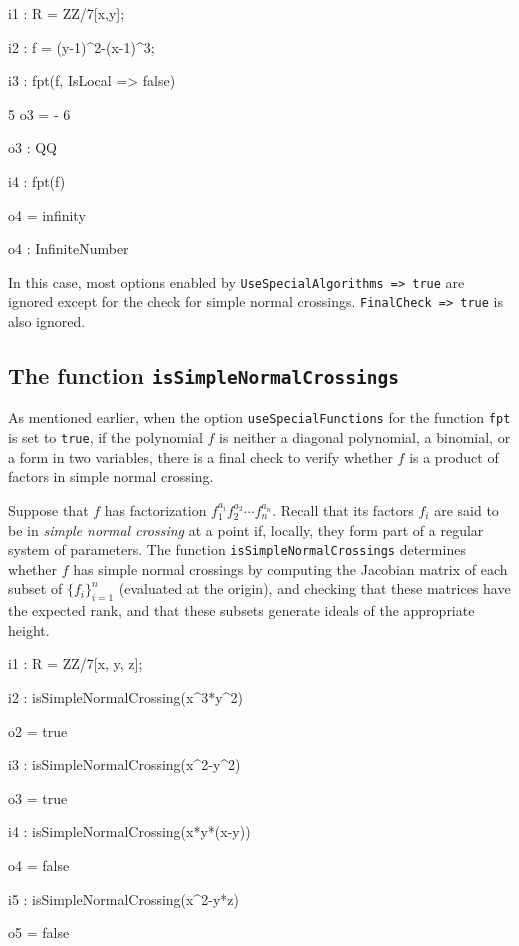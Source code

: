 \documentclass{amsart}
\begin{document}
{\small
{}
\begin{MyVerbatim}

i1 : R = ZZ/7[x,y];

i2 : f = (y-1)^2-(x-1)^3;

i3 : fpt(f, IsLocal => false)

     5
o3 = -
     6

o3 : QQ

i4 : fpt(f)

o4 = infinity

o4 : InfiniteNumber
\end{MyVerbatim}
}
\medspace

\noindent In this case, most options enabled by {\tt UseSpecialAlgorithms => true}
are ignored except for the check for simple normal crossings.  {\tt FinalCheck => true}
is also ignored.
            
\subsection{The function {\tt isSimpleNormalCrossings}} \label{subsec.SNC}
As mentioned earlier, 
when the option {\tt useSpecialFunctions} for the function {\tt fpt} is set to {\tt true}, if the polynomial $f$ is neither a diagonal polynomial, a binomial, or a form in two variables, there is a final check to verify whether $f$ is a product of factors in simple normal crossing. 

Suppose that $f$ has factorization $f_1^{a_i} f_2^{a_2} \cdots f_n^{a_n}$.  Recall that its factors $f_i$ are said to be in 
\emph{simple normal crossing} at a point if, locally, they form part of a regular system of parameters.  The function {\tt isSimpleNormalCrossings} determines whether $f$ has simple normal crossings by computing the Jacobian matrix of each subset of $\{ f_i \}_{i=1}^n$ (evaluated at the origin), and checking that these matrices have the expected rank, and that these subsets generate ideals of the appropriate height.

{\small
{}
\begin{MyVerbatim}

i1 : R = ZZ/7[x, y, z];

i2 : isSimpleNormalCrossing(x^3*y^2)

o2 = true

i3 : isSimpleNormalCrossing(x^2-y^2)

o3 = true

i4 : isSimpleNormalCrossing(x*y*(x-y))

o4 = false

i5 : isSimpleNormalCrossing(x^2-y*z)

o5 = false
\end{MyVerbatim}
}
\medspace
\end{document}
